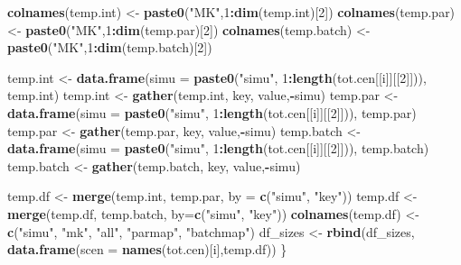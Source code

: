 \documentclass[]{article}
\newenvironment{Shaded}{\begin{snugshade}}{\end{snugshade}}
\newcommand{\DataTypeTok}[1]{\textcolor[rgb]{0.13,0.29,0.53}{#1}}
\newcommand{\DecValTok}[1]{\textcolor[rgb]{0.00,0.00,0.81}{#1}}
\newcommand{\KeywordTok}[1]{\textcolor[rgb]{0.13,0.29,0.53}{\textbf{#1}}}
\newcommand{\NormalTok}[1]{#1}
\newcommand{\OperatorTok}[1]{\textcolor[rgb]{0.81,0.36,0.00}{\textbf{#1}}}
\newcommand{\StringTok}[1]{\textcolor[rgb]{0.31,0.60,0.02}{#1}}
\begin{document}
\begin{Shaded}
\begin{Highlighting}[]
  \KeywordTok{colnames}\NormalTok{(temp.int) <-}\StringTok{ }\KeywordTok{paste0}\NormalTok{(}\StringTok{"MK"}\NormalTok{,}\DecValTok{1}\OperatorTok{:}\KeywordTok{dim}\NormalTok{(temp.int)[}\DecValTok{2}\NormalTok{])}
  \KeywordTok{colnames}\NormalTok{(temp.par) <-}\StringTok{ }\KeywordTok{paste0}\NormalTok{(}\StringTok{"MK"}\NormalTok{,}\DecValTok{1}\OperatorTok{:}\KeywordTok{dim}\NormalTok{(temp.par)[}\DecValTok{2}\NormalTok{])}
  \KeywordTok{colnames}\NormalTok{(temp.batch) <-}\StringTok{ }\KeywordTok{paste0}\NormalTok{(}\StringTok{"MK"}\NormalTok{,}\DecValTok{1}\OperatorTok{:}\KeywordTok{dim}\NormalTok{(temp.batch)[}\DecValTok{2}\NormalTok{])}
  
\NormalTok{  temp.int <-}\StringTok{ }\KeywordTok{data.frame}\NormalTok{(}\DataTypeTok{simu =} \KeywordTok{paste0}\NormalTok{(}\StringTok{"simu"}\NormalTok{, }\DecValTok{1}\OperatorTok{:}\KeywordTok{length}\NormalTok{(tot.cen[[i]][[}\DecValTok{2}\NormalTok{]])),}
\NormalTok{                         temp.int)}
\NormalTok{  temp.int <-}\StringTok{ }\KeywordTok{gather}\NormalTok{(temp.int, key, value,}\OperatorTok{-}\NormalTok{simu)}
\NormalTok{  temp.par <-}\StringTok{ }\KeywordTok{data.frame}\NormalTok{(}\DataTypeTok{simu =} \KeywordTok{paste0}\NormalTok{(}\StringTok{"simu"}\NormalTok{, }\DecValTok{1}\OperatorTok{:}\KeywordTok{length}\NormalTok{(tot.cen[[i]][[}\DecValTok{2}\NormalTok{]])),}
\NormalTok{                         temp.par)}
\NormalTok{  temp.par <-}\StringTok{ }\KeywordTok{gather}\NormalTok{(temp.par, key, value,}\OperatorTok{-}\NormalTok{simu)}
\NormalTok{  temp.batch <-}\StringTok{ }\KeywordTok{data.frame}\NormalTok{(}\DataTypeTok{simu =} \KeywordTok{paste0}\NormalTok{(}\StringTok{"simu"}\NormalTok{, }\DecValTok{1}\OperatorTok{:}\KeywordTok{length}\NormalTok{(tot.cen[[i]][[}\DecValTok{2}\NormalTok{]])),}
\NormalTok{                         temp.batch)}
\NormalTok{  temp.batch <-}\StringTok{ }\KeywordTok{gather}\NormalTok{(temp.batch, key, value,}\OperatorTok{-}\NormalTok{simu)}
  
\NormalTok{  temp.df <-}\StringTok{ }\KeywordTok{merge}\NormalTok{(temp.int, temp.par, }\DataTypeTok{by =} \KeywordTok{c}\NormalTok{(}\StringTok{"simu"}\NormalTok{, }\StringTok{"key"}\NormalTok{))}
\NormalTok{  temp.df <-}\StringTok{ }\KeywordTok{merge}\NormalTok{(temp.df, temp.batch, }\DataTypeTok{by=}\KeywordTok{c}\NormalTok{(}\StringTok{"simu"}\NormalTok{, }\StringTok{"key"}\NormalTok{))}
  \KeywordTok{colnames}\NormalTok{(temp.df) <-}\StringTok{ }\KeywordTok{c}\NormalTok{(}\StringTok{"simu"}\NormalTok{, }\StringTok{"mk"}\NormalTok{, }\StringTok{"all"}\NormalTok{, }\StringTok{"parmap"}\NormalTok{, }\StringTok{"batchmap"}\NormalTok{)}
\NormalTok{  df_sizes <-}\StringTok{ }\KeywordTok{rbind}\NormalTok{(df_sizes, }\KeywordTok{data.frame}\NormalTok{(}\DataTypeTok{scen =} \KeywordTok{names}\NormalTok{(tot.cen)[i],temp.df))}
\NormalTok{\}}
\end{Highlighting}
\end{Shaded}
\end{document}
